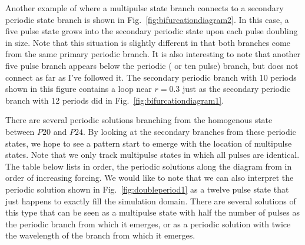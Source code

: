 \documentclass[../main/FlatMarginalStability.tex]{subfiles}
\begin{document}
Another example of where a  multipulse state branch connects to a secondary periodic state branch is shown in Fig.~\ref{fig:bifurcationdiagram2}.  In this case, a five pulse state grows into the secondary periodic state upon each pulse doubling in size.  Note that this situation is slightly different in that both branches come from the same primary periodic branch.  It is also interesting to note that another five pulse branch appears below the periodic ( or ten pulse) branch, but does not connect as far as I've followed it. The secondary periodic branch with 10 periods shown in this figure contains a loop near $r=0.3$ just as the secondary periodic branch with 12 periods did in Fig.~\ref{fig:bifurcationdiagram1}.  
\FIGbifurcationdiagramB

There are several periodic solutions branching from the homogenous state between $P20$ and $P24$.  By looking at the secondary branches from these periodic states, we hope to see a pattern start to emerge with the location of multipulse states.  Note that we only track multipulse states in which all pulses are identical.  The table below lists in order, the periodic solutions along the diagram from in order of increasing forcing.  We would like to note that we can also interpret the periodic solution shown in Fig.~\ref{fig:doubleperiod1} as a twelve pulse state that just happens to exactly fill the simulation domain.  There are several solutions of this type that can be seen as a multipulse state with half the number of pulses as the periodic branch from which it emerges, or as a periodic solution with twice the wavelength of the branch from which it emerges.  
\end{document}
